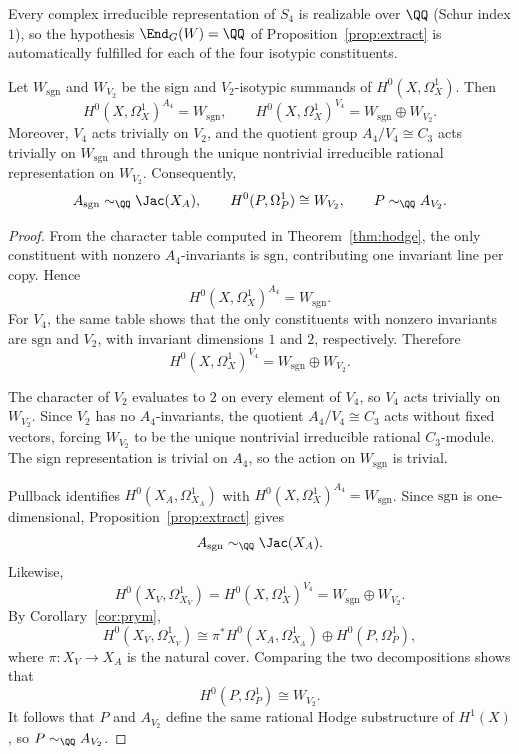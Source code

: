 \begin{remark}\label{rem:schur}
Every complex irreducible representation of \(S_4\) is realizable over \(\QQ\) (Schur index \(1\)), so the hypothesis \(\End_G(W)=\QQ\) of Proposition~\ref{prop:extract} is automatically fulfilled for each of the four isotypic constituents.
\end{remark}

\begin{proposition}\label{prop:sgn-v2}
Let \(W_{\mathrm{sgn}}\) and \(W_{V_2}\) be the sign and \(V_2\)-isotypic summands of \(H^0(X,\Omega_X^1)\). Then
\[
H^0(X,\Omega_X^1)^{A_4}=W_{\mathrm{sgn}},
\qquad
H^0(X,\Omega_X^1)^{V_4}=W_{\mathrm{sgn}}\oplus W_{V_2}.
\]
Moreover, \(V_4\) acts trivially on \(V_2\), and the quotient group \(A_4/V_4\cong C_3\) acts trivially on \(W_{\mathrm{sgn}}\) and through the unique nontrivial irreducible rational representation on \(W_{V_2}\). Consequently,
\[
A_{\mathrm{sgn}}\sim_{\QQ}\Jac(X_A),
\qquad
H^0(P,\Omega_P^1)\cong W_{V_2},
\qquad
P\sim_{\QQ}A_{V_2}.
\]
\end{proposition}

\begin{proof}
From the character table computed in Theorem~\ref{thm:hodge}, the only constituent with nonzero \(A_4\)-invariants is \(\mathrm{sgn}\), contributing one invariant line per copy. Hence
\[
H^0(X,\Omega_X^1)^{A_4}=W_{\mathrm{sgn}}.
\]
For \(V_4\), the same table shows that the only constituents with nonzero invariants are \(\mathrm{sgn}\) and \(V_2\), with invariant dimensions \(1\) and \(2\), respectively. Therefore
\[
H^0(X,\Omega_X^1)^{V_4}=W_{\mathrm{sgn}}\oplus W_{V_2}.
\]

The character of \(V_2\) evaluates to \(2\) on every element of \(V_4\), so \(V_4\) acts trivially on \(W_{V_2}\). Since \(V_2\) has no \(A_4\)-invariants, the quotient \(A_4/V_4\cong C_3\) acts without fixed vectors, forcing \(W_{V_2}\) to be the unique nontrivial irreducible rational \(C_3\)-module. The sign representation is trivial on \(A_4\), so the action on \(W_{\mathrm{sgn}}\) is trivial.

Pullback identifies \(H^0(X_A,\Omega_{X_A}^1)\) with \(H^0(X,\Omega_X^1)^{A_4}=W_{\mathrm{sgn}}\). Since \(\mathrm{sgn}\) is one-dimensional, Proposition~\ref{prop:extract} gives
\[
A_{\mathrm{sgn}}\sim_{\QQ}\Jac(X_A).
\]
Likewise,
\[
H^0(X_V,\Omega_{X_V}^1)=H^0(X,\Omega_X^1)^{V_4}=W_{\mathrm{sgn}}\oplus W_{V_2}.
\]
By Corollary~\ref{cor:prym},
\[
H^0(X_V,\Omega_{X_V}^1)\cong \pi^*H^0(X_A,\Omega_{X_A}^1)\oplus H^0(P,\Omega_P^1),
\]
where \(\pi:X_V\to X_A\) is the natural cover. Comparing the two decompositions shows that
\[
H^0(P,\Omega_P^1)\cong W_{V_2}.
\]
It follows that \(P\) and \(A_{V_2}\) define the same rational Hodge substructure of \(H^1(X)\), so \(P\sim_{\QQ}A_{V_2}\).
\end{proof}

